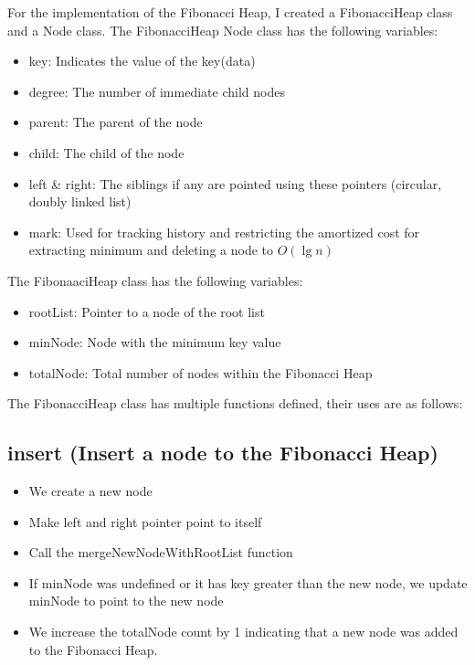 
For the implementation of the Fibonacci Heap, I created a FibonacciHeap class and a Node class.
The FibonacciHeap Node class has the following variables:
\begin{itemize}
	\item key: Indicates the value of the key(data)
	\item degree: The number of immediate child nodes
	\item parent: The parent of the node
	\item child: The child of the node
	\item left \& right: The siblings if any are pointed using these pointers (circular, doubly linked list)
	\item mark: Used for tracking history and restricting the amortized cost for extracting minimum and deleting a node to $O(\lg{n})$  
\end{itemize}
The FibonaaciHeap class has the following variables: 
\begin{itemize}
	\item rootList: Pointer to a node of the root list
	\item minNode: Node with the minimum key value
	\item totalNode: Total number of nodes within the Fibonacci Heap
\end{itemize}
The FibonacciHeap class has multiple functions defined, their uses are as follows:
\subsection{ insert (Insert a node to the Fibonacci Heap) }
\begin{itemize}
		\item We create a new node
		\item Make left and right pointer point to itself
		\item Call the mergeNewNodeWithRootList function
		\item If minNode was undefined or it has key greater than the new node, we update minNode to point to the new node
		\item We increase the totalNode count by 1 indicating that a new node was added to the Fibonacci Heap.
\end{itemize}

